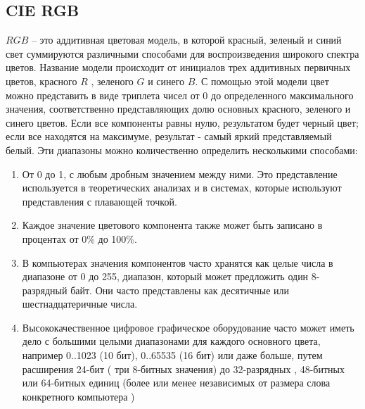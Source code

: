 \subsection{CIE RGB}
$RGB$ -- это аддитивная цветовая модель, в которой красный, зеленый и синий свет суммируются различными способами для воспроизведения широкого спектра цветов. Название модели происходит от инициалов трех аддитивных первичных цветов, красного $R$ , зеленого $G$ и синего $B$.
С помощью этой модели цвет можно представить в виде триплета чисел от 0 до определенного максимального значения, соответственно представляющих долю основных красного, зеленого и синего цветов. Если все компоненты равны нулю, результатом будет черный цвет; если все находятся на максимуме, результат - самый яркий представляемый белый.
Эти диапазоны можно количественно определить несколькими способами:
\begin{enumerate}
	\item От 0 до 1, с любым дробным значением между ними. Это представление используется в теоретических анализах и в системах, которые используют представления с плавающей точкой.
	\item Каждое значение цветового компонента также может быть записано в процентах от 0\% до 100\%.
	\item В компьютерах значения компонентов часто хранятся как целые числа в диапазоне от 0 до 255, диапазон, который может предложить один 8-разрядный байт. Они часто представлены как десятичные или шестнадцатеричные числа.
	\item Высококачественное цифровое графическое оборудование часто может иметь дело с большими целыми диапазонами для каждого основного цвета, например 0..1023 (10 бит), 0..65535 (16 бит) или даже больше, путем расширения 24-бит ( три 8-битных значения) до 32-разрядных , 48-битных или 64-битных единиц (более или менее независимых от размера слова конкретного компьютера )
\end{enumerate}	

\begin{figure}[ht!]
\end{figure}

